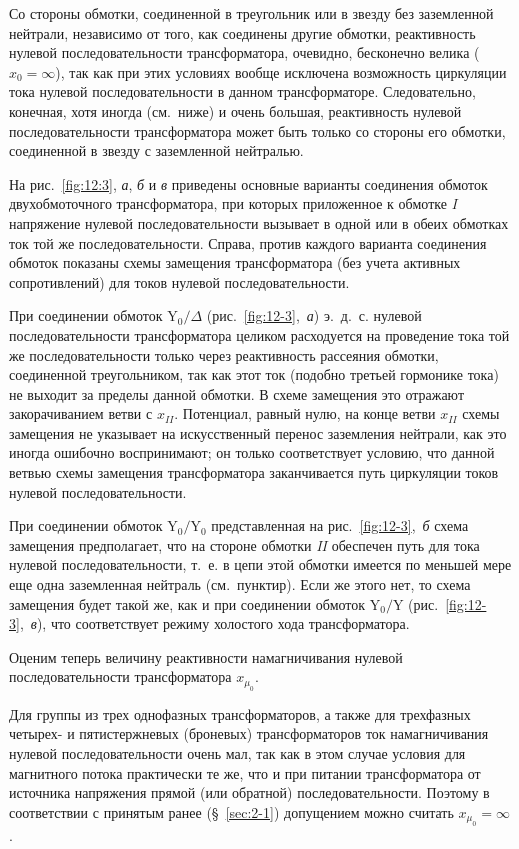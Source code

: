Со стороны обмотки, соединенной в треугольник или в звезду без заземленной нейтрали, независимо от того, как соединены другие обмотки, реактивность нулевой последовательности трансформатора, очевидно, бесконечно велика ($ x_0 = \infty $), так как при этих условиях вообще исключена возможность циркуляции тока нулевой последовательности в данном трансформаторе. Следовательно, конечная, хотя иногда (см.~ниже) и очень большая, реактивность нулевой последовательности трансформатора может быть только со стороны его обмотки, соединенной в звезду с заземленной нейтралью.

На рис.~\ref{fig:12:3}, \textit{а}, \textit{б} и \textit{в} приведены основные варианты соединения обмоток двухобмоточного трансформатора, при которых приложенное к обмотке \textit{I} напряжение нулевой последовательности вызывает в одной или в обеих обмотках ток той же последовательности. Справа, против каждого варианта соединения обмоток показаны схемы замещения трансформатора (без учета активных сопротивлений) для токов нулевой последовательности.

При соединении обмоток $ \text{Y}_0 / \Delta $ (рис.~\ref{fig:12-3},~\textit{а}) э.~д.~с. нулевой последовательности трансформатора целиком расходуется на проведение тока той же последовательности только через реактивность рассеяния обмотки, соединенной треугольником, так как этот ток (подобно третьей гормонике тока) не выходит за пределы данной обмотки. В схеме замещения это отражают закорачиванием ветви с $ x_{II} $. Потенциал, равный нулю, на конце ветви $ x_{II} $ схемы замещения не указывает на искусственный перенос заземления нейтрали, как это иногда ошибочно воспринимают; он только соответствует условию, что данной ветвью схемы замещения трансформатора заканчивается путь циркуляции токов нулевой последовательности.

При соединении обмоток $ \text{Y}_0 / \text{Y}_0 $ представленная на рис.~\ref{fig:12-3},~\textit{б} схема замещения предполагает, что на стороне обмотки \textit{II} обеспечен путь для тока нулевой последовательности, т.~е. в цепи этой обмотки имеется по меньшей мере еще одна заземленная нейтраль (см.~пунктир). Если же этого нет, то схема замещения будет такой же, как и при соединении обмоток $ \text{Y}_0 / \text{Y} $ (рис.~\ref{fig:12-3},~\textit{в}), что соответствует режиму холостого хода трансформатора.

Оценим теперь величину реактивности намагничивания нулевой последовательности трансформатора $ x_{\mu_0} $.

Для группы из трех однофазных трансформаторов, а также для трехфазных четырех- и пятистержневых (броневых) трансформаторов ток намагничивания нулевой последовательности очень мал, так как в этом случае условия для магнитного потока практически те же, что и при питании трансформатора от источника напряжения прямой (или обратной) последовательности. Поэтому в соответствии с принятым ранее (§~\ref{sec:2-1}) допущением можно считать $ x_{\mu_0} = \infty $.

